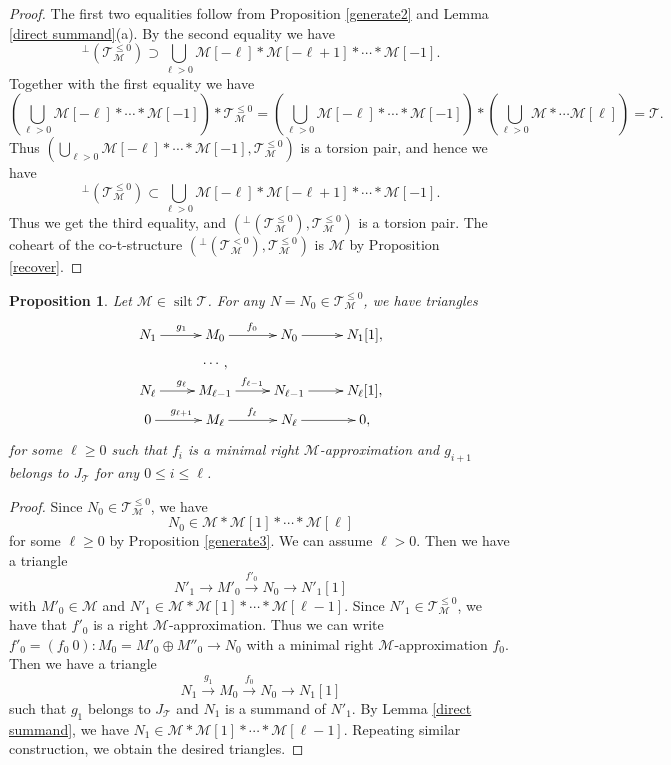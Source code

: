\documentclass[a4paper,reqno]{amsart}
\newtheorem{proposition}[theorem]{Proposition}
\theoremstyle{definition}
\newcommand{\TT}{{\mathcal T}}
\newcommand{\MM}{{\mathcal M}}
\newcommand{\silt}{\operatorname{silt}\nolimits}
\begin{document}
\begin{proof}
The first two equalities follow from Proposition \ref{generate2} and Lemma \ref{direct summand}(a).
By the second equality we have 
\[{}^{\perp}(\TT^{\leq 0}_{\MM})\supset\bigcup_{\ell>0}\MM[-\ell]*\MM[-\ell+1]*\cdots*\MM[-1].\]
Together with the first equality we have
\[(\bigcup_{\ell>0}\MM[-\ell]*\cdots*\MM[-1])*\TT^{\leq 0}_{\MM}=(\bigcup_{\ell>0}\MM[-\ell]*\cdots*\MM[-1])*(\bigcup_{\ell>0}\MM*\cdots\MM[\ell])=\TT.\]
Thus $(\bigcup_{\ell>0}\MM[-\ell]*\cdots*\MM[-1], \TT^{\leq 0}_{\MM})$ is a torsion pair, and hence we have
\[{}^{\perp}(\TT^{\leq 0}_{\MM})\subset\bigcup_{\ell>0}\MM[-\ell]*\MM[-\ell+1]*\cdots*\MM[-1].\]
Thus we get the third equality, and $({}^{\perp}(\TT^{\leq 0}_{\MM}), \TT^{\leq 0}_{\MM})$ is a torsion pair.
The coheart of the co-t-structure $({}^{\perp}(\TT^{<0}_{\MM}), \TT^{\leq 0}_{\MM})$ is $\MM$ by Proposition \ref{recover}.
\end{proof}

\begin{proposition}\label{resolution}
Let $\MM\in\silt\TT$. For any $N=N_0\in\TT_{\MM}^{\le0}$, we have triangles
\[\xymatrix@R=0.2cm{
N_1\ar[r]^{g_1}&M_0\ar[r]^{f_0}&N_0\ar[r]&N_1[1],\\
&\cdots,\\
N_\ell\ar[r]^{g_\ell}&M_{\ell-1}\ar[r]^{f_{\ell-1}}&N_{\ell-1}\ar[r]&N_\ell[1],\\
0\ar[r]^{g_{\ell+1}}&M_\ell\ar[r]^{f_\ell}&N_\ell\ar[r]&0,
}\]
for some $\ell\ge0$ such that $f_i$ is a minimal right $\MM$-approximation and
$g_{i+1}$ belongs to $J_{\TT}$ for any $0\le i\le \ell$.
\end{proposition}

\begin{proof}
Since $N_0\in\TT_{\MM}^{\le0}$, we have
\[N_0\in\MM*\MM[1]*\cdots*\MM[\ell]\]
for some $\ell\ge0$ by Proposition \ref{generate3}.
We can assume $\ell>0$. Then we have a triangle
\[N'_1\to M'_0\xrightarrow{f'_0}N_0\to N'_1[1]\]
with $M'_0\in\MM$ and $N'_1\in\MM*\MM[1]*\cdots*\MM[\ell-1]$.
Since $N'_1\in\TT_{\MM}^{\le0}$, we have that $f'_0$ is a right $\MM$-approximation.
Thus we can write
$f'_0=(f_0\ 0):M_0=M'_0\oplus M''_0\to N_0$ with a minimal right $\MM$-approximation $f_0$.
Then we have a triangle
\[N_1\xrightarrow{g_1}M_0\xrightarrow{f_0}N_0\to N_1[1]\]
such that $g_1$ belongs to $J_{\TT}$ and $N_1$ is a summand of $N'_1$.
By Lemma \ref{direct summand}, we have $N_1\in\MM*\MM[1]*\cdots*\MM[\ell-1]$.
Repeating similar construction, we obtain the desired triangles.
\end{proof}
\end{document}
